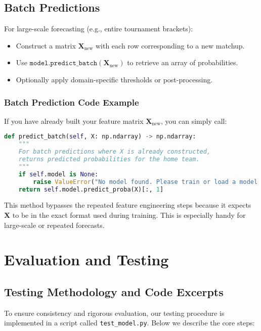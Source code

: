 \documentclass[12pt]{article}
\begin{document}
\subsection{Batch Predictions}
For large-scale forecasting (e.g., entire tournament brackets):
\begin{itemize}[noitemsep]
    \item Construct a matrix \(\mathbf{X}_{\text{new}}\) with each row corresponding to a new matchup.
    \item Use \(\texttt{model.predict\_batch}(\mathbf{X}_{\text{new}})\) to retrieve an array of probabilities.
    \item Optionally apply domain-specific thresholds or post-processing.
\end{itemize}

\subsubsection{Batch Prediction Code Example}
If you have already built your feature matrix \(\mathbf{X}_{\text{new}}\), you can simply call:

\begin{lstlisting}[language=Python]
def predict_batch(self, X: np.ndarray) -> np.ndarray:
    """
    For batch predictions where X is already constructed,
    returns predicted probabilities for the home team.
    """
    if self.model is None:
        raise ValueError("No model found. Please train or load a model.")
    return self.model.predict_proba(X)[:, 1]
\end{lstlisting}

\noindent
This method bypasses the repeated feature engineering steps because it expects \(\mathbf{X}\) to be in the exact format used during training. This is especially handy for large-scale or repeated forecasts.
\section{Evaluation and Testing}
\label{sec:evaluation_testing}
\subsection{Testing Methodology and Code Excerpts}
To ensure consistency and rigorous evaluation, our testing procedure is implemented in a script called \texttt{test\_model.py}. Below we describe the core steps:
\end{document}
